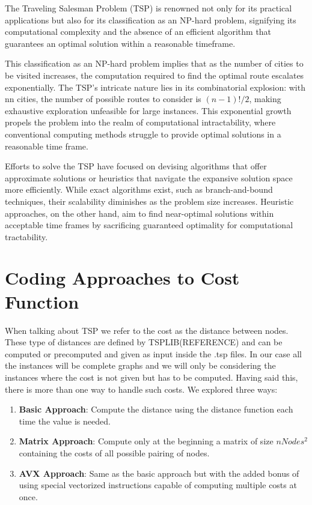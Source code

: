 \documentclass[a4paper]{article}
\begin{document}
The Traveling Salesman Problem (TSP) is renowned not only for its practical applications but also for its classification as an NP-hard problem, signifying its computational complexity and the absence of an efficient algorithm that guarantees an optimal solution within a reasonable timeframe.

This classification as an NP-hard problem implies that as the number of cities to be visited increases, the computation required to find the optimal route escalates exponentially. The TSP's intricate nature lies in its combinatorial explosion: with nn cities, the number of possible routes to consider is $(n-1)!/2$, making exhaustive exploration unfeasible for large instances. This exponential growth propels the problem into the realm of computational intractability, where conventional computing methods struggle to provide optimal solutions in a reasonable time frame.

Efforts to solve the TSP have focused on devising algorithms that offer approximate solutions or heuristics that navigate the expansive solution space more efficiently. While exact algorithms exist, such as branch-and-bound techniques, their scalability diminishes as the problem size increases. Heuristic approaches, on the other hand, aim to find near-optimal solutions within acceptable time frames by sacrificing guaranteed optimality for computational tractability.


\section{Coding Approaches to Cost Function}

When talking about TSP we refer to the cost as the distance between nodes. These type of distances are defined by TSPLIB(REFERENCE) and can be computed or precomputed and given as input inside the .tsp files. In our case all the instances will be complete graphs and we will only be considering the instances where the cost is not given but has to be computed. Having said this, there is more than one way to handle such costs. We explored three ways:

\begin{enumerate}
	\item \textbf{Basic Approach}: Compute the distance using the distance function each time the value is needed.
	\item \textbf{Matrix Approach}: Compute only at the beginning a matrix of size $nNodes^2$ containing the costs of all possible pairing of nodes.
	\item \textbf{AVX Approach}: Same as the basic approach but with the added bonus of using special vectorized instructions capable of computing multiple costs at once.
\end{enumerate}
\end{document}
